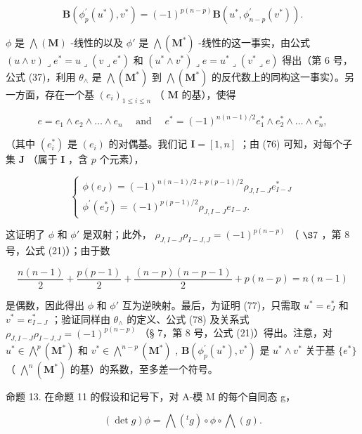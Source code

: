 \[
\mathbf {B} \left(\phi_ {p} ^ {\prime} (u ^ {*}), v ^ {*}\right) = (- 1) ^ {p (n - p)} \mathbf {B} \left(u ^ {*}, \phi_ {n - p} ^ {\prime} (v ^ {*})\right).\tag{77}
\]

\(\phi\) 是 \(\bigwedge (\mathbf{M})\) -线性的以及 \(\phi'\) 是 \(\bigwedge (\mathbf{M}^*)\) -线性的这一事实，由公式 \((u \wedge v) \lrcorner e^* = u \lrcorner (v \lrcorner e^*)\) 和 \((u^* \wedge v^*) \lrcorner e = u^* \lrcorner (v^* \lrcorner e)\) 得出（第 6 号，公式 (37)，利用 \(\theta_{\wedge}\) 是 \(\bigwedge (\mathbf{M}^*)\) 到 \(\bigwedge (\mathbf{M}^*)\) 的反代数上的同构这一事实）。另一方面，存在一个基 \((e_i)_{1 \leq i \leq n}\) （ \(\mathbf{M}\) 的基），使得

\[
e = e _ {1} \wedge e _ {2} \wedge \dots \wedge e _ {n} \quad \text { and } \quad e ^ {*} = (- 1) ^ {n (n - 1) / 2} e _ {1} ^ {*} \wedge e _ {2} ^ {*} \wedge \dots \wedge e _ {n} ^ {*},
\]

（其中 \((e_i^*)\) 是 \((e_i)\) 的对偶基。我们记 \(\mathbf{I} = [1, n]\) ；由 (76) 可知，对每个子集 \(\mathbf{J}\) （属于 \(\mathbf{I}\) ，含 \(p\) 个元素），

\[
\left\{ \begin{array}{l} \phi (e _ {J}) = (- 1) ^ {n (n - 1) / 2 + p (p - 1) / 2} \rho_ {J, I - J} e _ {I - J} ^ {*} \\ \phi^ {\prime} (e _ {J} ^ {*}) = (- 1) ^ {p (p - 1) / 2} \rho_ {J, I - J} e _ {I - J}. \end{array} \right.\tag{78}
\]

这证明了 \(\phi\) 和 \(\phi'\) 是双射；此外， \(\rho_{J,I-J}\rho_{I-J,J}=(-1)^{p(n-p)}\) （ \(\S 7\) ，第 8 号，公式 (21)）；由于数

\[
\frac {n (n - 1)}{2} + \frac {p (p - 1)}{2} + \frac {(n - p) (n - p - 1)}{2} + p (n - p) = n (n - 1)
\]

是偶数，因此得出 \(\phi\) 和 \(\phi'\) 互为逆映射。最后，为证明 (77)，只需取 \(u^{*} = e_{J}^{*}\) 和 \(v^{*} = e_{I - J}^{*}\) ；验证同样由 \(\theta_{\wedge}\) 的定义、公式 (78) 及关系式 \(\rho_{J,I - J}\rho_{I - J,J} = (-1)^{p(n - p)}\) （§ 7，第 8 号，公式 (21)）得出。注意，对 \(u^{*}\in \bigwedge^{p}(\mathbf{M}^{*})\) 和 \(v^{*}\in \bigwedge^{n - p}(\mathbf{M}^{*})\) , \(\mathbf{B}(\phi_{p}^{\prime}(u^{*}), v^{*})\) 是 \(u^{*} \wedge v^{*}\) 关于基 \(\{e^{*}\}\) （ \(\bigwedge^{n}(\mathbf{M}^{*})\) 的基）的系数，至多差一个符号。

命题 13. 在命题 11 的假设和记号下，对 A-模 M 的每个自同态 g，

\[
(\det g) \phi = \bigwedge (^ {t} g) \circ \phi \circ \bigwedge (g).\tag{79}
\]

